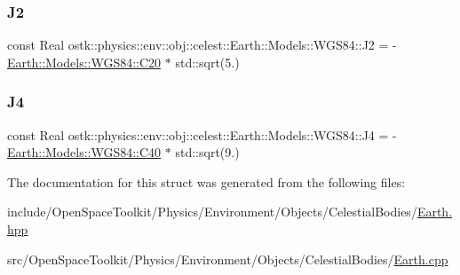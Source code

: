 \mbox{\label{structostk_1_1physics_1_1env_1_1obj_1_1celest_1_1_earth_1_1_models_1_1_w_g_s84_ac4a0736f324dc3faf5f5b279e7daac45}} 
\subsubsection{\texorpdfstring{J2}{J2}}
{\footnotesize\ttfamily const Real ostk\+::physics\+::env\+::obj\+::celest\+::\+Earth\+::\+Models\+::\+W\+G\+S84\+::\+J2 = -\/\hyperlink{structostk_1_1physics_1_1env_1_1obj_1_1celest_1_1_earth_1_1_models_1_1_w_g_s84_ae42abb8da1cf5323b3b01e604a2743ce}{Earth\+::\+Models\+::\+W\+G\+S84\+::\+C20} $\ast$ std\+::sqrt(5.)\hspace{0.3cm}{\ttfamily [static]}}

\mbox{\label{structostk_1_1physics_1_1env_1_1obj_1_1celest_1_1_earth_1_1_models_1_1_w_g_s84_a6f1fb23baa37eec49b9dfa0d3de03c08}} 
\subsubsection{\texorpdfstring{J4}{J4}}
{\footnotesize\ttfamily const Real ostk\+::physics\+::env\+::obj\+::celest\+::\+Earth\+::\+Models\+::\+W\+G\+S84\+::\+J4 = -\/\hyperlink{structostk_1_1physics_1_1env_1_1obj_1_1celest_1_1_earth_1_1_models_1_1_w_g_s84_ae9d28142169c46e5b199384a7559dea9}{Earth\+::\+Models\+::\+W\+G\+S84\+::\+C40} $\ast$ std\+::sqrt(9.)\hspace{0.3cm}{\ttfamily [static]}}



The documentation for this struct was generated from the following files\+:\begin{DoxyCompactItemize}
\item 
include/\+Open\+Space\+Toolkit/\+Physics/\+Environment/\+Objects/\+Celestial\+Bodies/\hyperlink{_objects_2_celestial_bodies_2_earth_8hpp}{Earth.\+hpp}\item 
src/\+Open\+Space\+Toolkit/\+Physics/\+Environment/\+Objects/\+Celestial\+Bodies/\hyperlink{_objects_2_celestial_bodies_2_earth_8cpp}{Earth.\+cpp}\end{DoxyCompactItemize}
